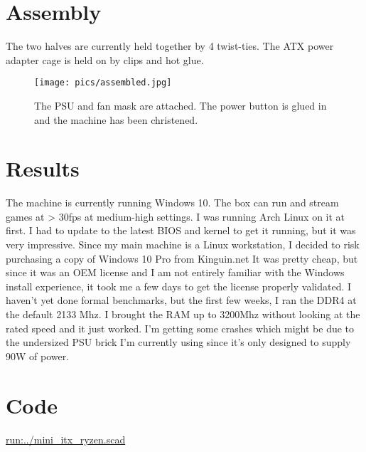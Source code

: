 \documentclass{article}
\begin{document}
\section{Assembly}
The two halves are currently held together by 4 twist-ties. The ATX power adapter cage is held on by clips and hot glue.

\begin{figure}[h]
\texttt{[image: pics/assembled.jpg]}
\caption{The PSU and fan mask are attached. The power button is glued in and the machine has been christened.}
\end{figure}

\section{Results}
The machine is currently running Windows 10. The box can run and stream games at > 30fps at medium-high settings. I was running Arch Linux on it at first. I had to update to the latest BIOS and kernel to get it running, but it was very impressive. Since my main machine is a Linux workstation, I decided to risk purchasing a copy of Windows 10 Pro from Kinguin.net It was pretty cheap, but since it was an OEM license and I am not entirely familiar with the Windows install experience, it took me a few days to get the license properly validated. I haven't yet done formal benchmarks, but the first few weeks, I ran the DDR4 at the default 2133 Mhz. I brought the RAM up to 3200Mhz without looking at the rated speed and it just worked. I'm getting some crashes which might be due to the undersized PSU brick I'm currently using since it's only designed to supply 90W of power.

\section{Code}
\url{run:../mini_itx_ryzen.scad}
\end{document}

